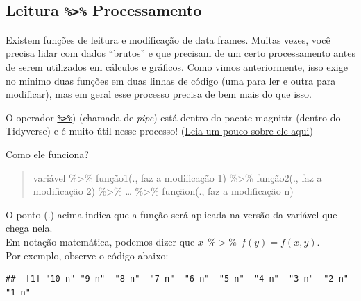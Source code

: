 \documentclass[]{book}
\newenvironment{Shaded}{\begin{snugshade}}{\end{snugshade}}
\newcommand{\KeywordTok}[1]{\textcolor[rgb]{0.13,0.29,0.53}{\textbf{#1}}}
\newcommand{\DataTypeTok}[1]{\textcolor[rgb]{0.13,0.29,0.53}{#1}}
\newcommand{\DecValTok}[1]{\textcolor[rgb]{0.00,0.00,0.81}{#1}}
\newcommand{\StringTok}[1]{\textcolor[rgb]{0.31,0.60,0.02}{#1}}
\newcommand{\OperatorTok}[1]{\textcolor[rgb]{0.81,0.36,0.00}{\textbf{#1}}}
\newcommand{\NormalTok}[1]{#1}
\theoremstyle{definition}
\theoremstyle{definition}
\theoremstyle{definition}
\theoremstyle{remark}
\begin{document}
\subsection{\texorpdfstring{Leitura \texttt{\%\textgreater{}\%}
Processamento}{Leitura \%\textgreater{}\% Processamento}}\label{leitura-processamento}

Existem funções de leitura e modificação de data frames. Muitas vezes,
você precisa lidar com dados ``brutos'' e que precisam de um certo
processamento antes de serem utilizados em cálculos e gráficos. Como
vimos anteriormente, isso exige no mínimo duas funções em duas linhas de
código (uma para ler e outra para modificar), mas em geral esse processo
precisa de bem mais do que isso.

O operador
\href{http://r4ds.had.co.nz/pipes.html}{\texttt{\%\textgreater{}\%}})
(chamada de \emph{pipe}) está dentro do pacote magnittr (dentro do
Tidyverse) e é muito útil nesse processo!
(\href{https://www.datacamp.com/community/tutorials/pipe-r-tutorial}{Leia
um pouco sobre ele aqui})

Como ele funciona?

\begin{quote}
variável \%\textgreater{}\% função1(., faz a modificação 1)
\%\textgreater{}\% função2(., faz a modificação 2) \%\textgreater{}\%
\ldots{} \%\textgreater{}\% funçãon(., faz a modificação n)
\end{quote}

O ponto (.) acima indica que a função será aplicada na versão da
variável que chega nela.\\
Em notação matemática, podemos dizer que
\(x \ \ \%>\% \ \ f(y) = f(x,y)\).\\
Por exemplo, observe o código abaixo:

\begin{Shaded}
\end{Shaded}

\begin{verbatim}
##  [1] "10 n" "9 n"  "8 n"  "7 n"  "6 n"  "5 n"  "4 n"  "3 n"  "2 n"  "1 n"
\end{verbatim}
\end{document}
